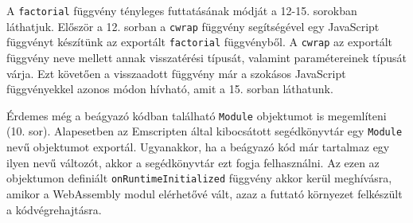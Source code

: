 A \texttt{factorial} függvény tényleges futtatásának módját a 12-15. sorokban láthatjuk. Először a 12. sorban a \texttt{cwrap} függvény segítségével egy JavaScript függvényt készítünk az exportált \texttt{factorial} függvényből. A \texttt{cwrap} az exportált függvény neve mellett annak visszatérési típusát, valamint paramétereinek típusát várja. Ezt követően a visszaadott függvény már a szokásos JavaScript függvényekkel azonos módon hívható, amit a 15. sorban láthatunk.

Érdemes még a beágyazó kódban található \texttt{Module} objektumot is megemlíteni (10. sor). Alapesetben az Emscripten által kibocsátott segédkönyvtár egy \texttt{Module} nevű objektumot exportál. Ugyanakkor, ha a beágyazó kód már tartalmaz egy ilyen nevű változót, akkor a segédkönyvtár ezt fogja felhasználni. Az ezen az objektumon definiált \texttt{onRuntimeInitialized} függvény akkor kerül meghívásra, amikor a WebAssembly modul elérhetővé vált, azaz a futtató környezet felkészült a kódvégrehajtásra.
